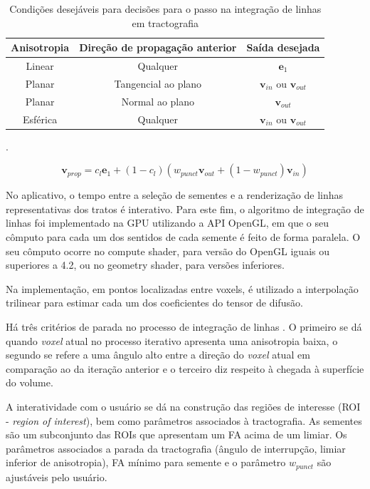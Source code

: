 \documentclass[
    12pt,                %
    oneside,            %
    a4paper,            %
    english,            %
    french,                %
    spanish,            %
    brazil                %
    ]{abntex2}
\begin{document}
\begin{table}[h]
\centering
\begin{tabular}{|c|c|c|}
\hline
\textbf{Anisotropia} & \textbf{Direção de propagação anterior} & \textbf{Saída desejada} \\ \hline
Linear               & Qualquer                                & $\mathbf{e}_1$                   \\ \hline
Planar               & Tangencial ao plano                     & $\mathbf{v}_{in}$ ou $\mathbf{v}_{out}$   \\ \hline
Planar               & Normal ao plano                         & $\mathbf{v}_{out}$            \\ \hline
Esférica             & Qualquer                                & $\mathbf{v}_{in}$ ou $\mathbf{v}_{out}$   \\ \hline
\end{tabular}
\caption{Condições desejáveis para decisões para o passo na integração de linhas em tractografia \cite{Weinstein1999}}.
\label{tab::tracto_desirable_conditions}
\end{table}

\begin{equation}
\label{eq::tractografia_weinstein}
    \textbf{v}_{prop} = c_l\mathbf{e}_1 + (1 - c_l)(w_{punct}\mathbf{v}_{out} + (1-w_{punct})\mathbf{v}_{in})
\end{equation}


No aplicativo, o tempo entre a seleção de sementes e a renderização de linhas representativas dos tratos é interativo. Para este fim, o algoritmo de integração de linhas foi implementado na GPU utilizando a API OpenGL, em que o seu cômputo para cada um dos sentidos de cada semente é feito de forma paralela. O seu cômputo ocorre no compute shader, para versão do OpenGL iguais ou superiores a 4.2, ou no geometry shader, para versões inferiores.

Na implementação, em pontos localizadas entre voxels, é utilizado a interpolação trilinear para estimar cada um dos coeficientes do tensor de difusão.

Há três critérios de parada no processo de integração de linhas \cite{basser2000}. O primeiro se dá quando \textit{voxel} atual no processo iterativo apresenta uma anisotropia baixa, o segundo se refere a uma ângulo alto entre a direção do \textit{voxel} atual em comparação ao da iteração anterior e o terceiro diz respeito à chegada à superfície do volume.

A interatividade com o usuário se dá na construção das regiões de interesse (ROI - \textit{region of interest}), bem como parâmetros associados à tractografia. As sementes são um subconjunto das ROIs que apresentam um FA acima de um limiar. Os parâmetros associados a parada da tractografia (ângulo de interrupção, limiar inferior de anisotropia), FA mínimo para semente e o parâmetro $w_{punct}$ são ajustáveis pelo usuário.
\end{document}
